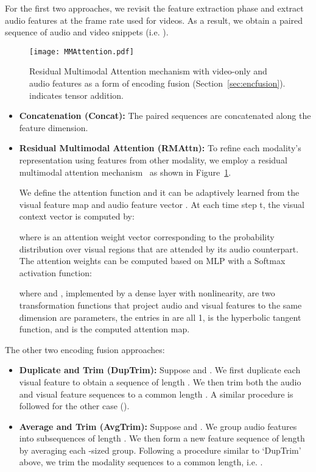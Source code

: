 \documentclass[10pt,twocolumn,letterpaper]{article}
\begin{document}
For the first two approaches, we revisit the feature extraction phase and extract audio features at the frame rate used for videos. As a result, we obtain a paired sequence of audio and video snippets (i.e. ).

\begin{figure}[!t]
    \centering
    \noindent
    \texttt{[image: MMAttention.pdf]}
    \caption{Residual Multimodal Attention mechanism with video-only and audio features as a form of encoding fusion (Section~\ref{sec:encfusion}).   indicates tensor addition.}
    \label{fig:mmatt}
\end{figure}

\begin{itemize}
\item \textbf{Concatenation (Concat):} The paired sequences are concatenated along the feature dimension.

\item \textbf{Residual Multimodal Attention (RMAttn):}  To refine each modality's representation using features from other modality, we employ a residual multimodal attention mechanism~\cite{tian2018audiovisual} as shown in Figure~\ref{fig:mmatt}. 

We define the attention function  and it can be adaptively learned from the visual feature map  and audio feature vector . At each time step t, the visual context vector is computed by:


where  is an attention weight vector corresponding to the probability distribution over  visual regions that are attended by its audio counterpart. The
attention weights can be computed based on MLP with a Softmax activation
function:


 
 
 
where  and , implemented by a dense layer with nonlinearity, are two transformation functions that project audio and visual features to the same dimension
 are parameters, the entries in  are all 1,  is the hyperbolic tangent function, and 
is the computed attention map. 
\end{itemize}



The other two encoding fusion approaches:
\begin{itemize}
    
\item \textbf{Duplicate and Trim (DupTrim):} Suppose  and . We first duplicate each visual feature to obtain a sequence of length . We then trim both the audio and visual feature sequences to a common length . A similar procedure is followed for the other case ().  

\item \textbf{Average and Trim (AvgTrim):} Suppose  and . We group audio features into subsequences of length . We then form a new feature sequence of length  by averaging each -sized group. Following a procedure similar to `DupTrim' above, we trim the modality sequences to a common length, i.e. . 

\end{itemize}
\end{document}
